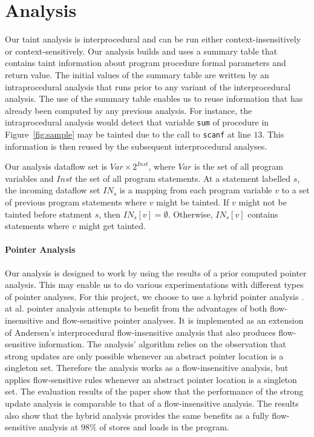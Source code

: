 \section{Analysis}\label{stagedAnalysis}

\newcommand{\varset}{\mathit{Var}}
\newcommand{\instset}{\mathit{Inst}}
\newcommand{\myinflow}{\mathit{IN}}
\newcommand{\ifff}{\mathit{iff}}
\newcommand{\aand}{\mathit{and}}

Our taint analysis is interprocedural and can be run
either context-insensitively or context-sensitively.
Our analysis builds and uses a summary table that contains
taint information about program procedure formal parameters
and return value.
The initial values of the summary table are written by
an intraprocedural analysis that runs prior to any variant
of the interprocedural analysis. The use of the
summary table enables us to reuse information that has
already been computed by any previous analysis. For
instance, the intraprocedural analysis would detect that
variable \texttt{sum} of procedure \compute{} in
Figure~\ref{fig:sample} may be tainted due to the call
to \texttt{scanf} at line $13$. This information is then
reused by the subsequent interprocedural analyses.

Our analysis dataflow set is $\varset \times 2^\instset$,
where $\varset$ is the set of all program variables and
$\instset$ the set of all program statements. 
At a statement labelled $s$, the incoming dataflow set $\myinflow_s$
is a mapping from each program variable $v$ to a set of
previous program statements where $v$ might be tainted.
If $v$ might not be tainted before statment $s$, then
$\myinflow_s[v] = \emptyset$. Otherwise, $\myinflow_s[v]$
contains statements where $v$ might get tainted.

\paragraph{Pointer Analysis}
Our analysis is designed to work by using the results of
a prior computed pointer analysis. This may enable us to
do various experimentations with different types of pointer
analyses. For this project, we choose to use a hybrid
pointer analysis \cite{Lhotak:2011:PAE}. \lothak{} at al.
pointer analysis attempts to benefit from the
advantages of both flow-insensitive and flow-sensitive 
pointer analyses. It is implemented as an extension of
Andersen's interprocedural flow-insensitive analysis that
also produces flow-sensitive information. The analysis'
algorithm relies on the observation that strong updates
are only possible whenever an abstract pointer location is
a singleton set. Therefore the analysis works as a
flow-insensitive analysis, but applies flow-sensitive
rules whenever an abstract pointer location is a singleton set.
The evaluation results of the paper show that the performance
of the strong update analysis is comparable to that of a
flow-insensitive analysis. The results also show that the hybrid
analysis provides the same benefits as a fully flow-sensitive
analysis at $98\%$ of stores and loads in the program.

